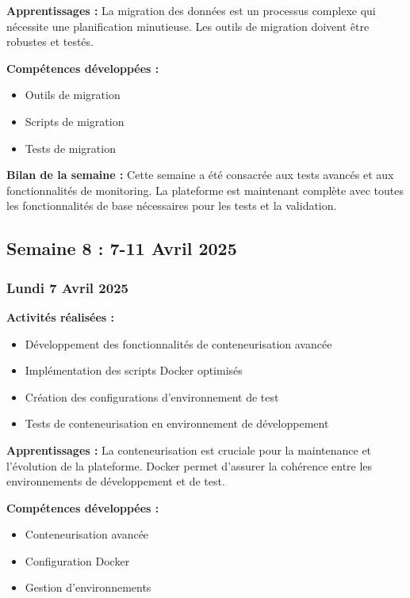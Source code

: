 \documentclass[12pt,a4paper]{article}
\begin{document}
\textbf{Apprentissages :}
La migration des données est un processus complexe qui nécessite une planification minutieuse. Les outils de migration doivent être robustes et testés.

\textbf{Compétences développées :}
\begin{itemize}
    \item Outils de migration
    \item Scripts de migration
    \item Tests de migration
\end{itemize}

\textbf{Bilan de la semaine :}
Cette semaine a été consacrée aux tests avancés et aux fonctionnalités de monitoring. La plateforme est maintenant complète avec toutes les fonctionnalités de base nécessaires pour les tests et la validation.

\clearpage
\subsection{Semaine 8 : 7-11 Avril 2025}

\subsubsection{Lundi 7 Avril 2025}
\textbf{Activités réalisées :}
\begin{itemize}
    \item Développement des fonctionnalités de conteneurisation avancée
    \item Implémentation des scripts Docker optimisés
    \item Création des configurations d'environnement de test
    \item Tests de conteneurisation en environnement de développement
\end{itemize}

\textbf{Apprentissages :}
La conteneurisation est cruciale pour la maintenance et l'évolution de la plateforme. Docker permet d'assurer la cohérence entre les environnements de développement et de test.

\textbf{Compétences développées :}
\begin{itemize}
    \item Conteneurisation avancée
    \item Configuration Docker
    \item Gestion d'environnements
\end{itemize}
\end{document}
